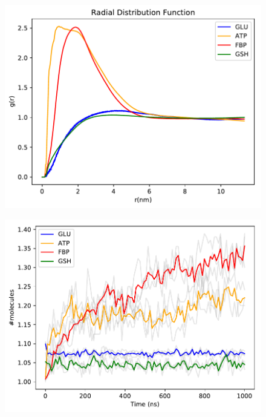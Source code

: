 \documentclass[journal=jacsat,manuscript=article]{achemso}
\begin{document}
\begin{figure}
\includegraphics[scale=0.6]{rdf_RNA_metabolites.pdf}
\end{figure}

\begin{figure}
\includegraphics[scale=0.6]{avclust.pdf}
\end{figure}
\end{document}
